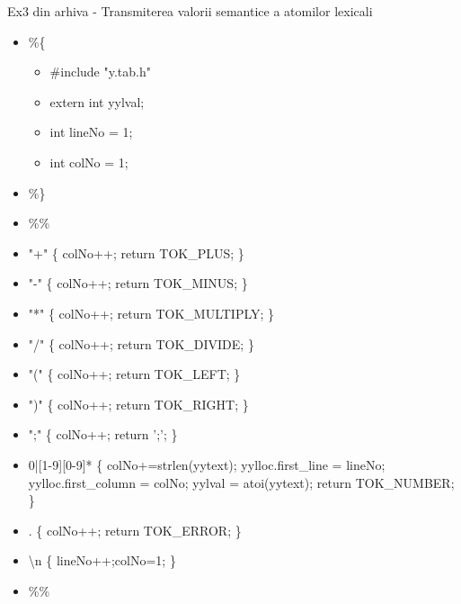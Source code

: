\documentclass[pdf]{beamer}
\begin{document}
\begin{frame}{Ex3 din arhiva - Transmiterea valorii semantice a atomilor lexicali}
\begin{itemize}
	\item[]
	\footnotesize\%\{
	
	\begin{itemize}
		\item[]
		\#include "y.tab.h"

		\item[]
		extern int yylval;

		\item[]
		int lineNo = 1;

		\item[]
		int colNo = 1;
	\end{itemize}
	
	\item[]
	\footnotesize\%\}

	\item[]
	\footnotesize\%\%

	\item[]
	"+" \hspace{1.55cm} \{ colNo++; return TOK\_PLUS; \}

	\item[]
	"-" \hspace{1.7cm} \{ colNo++; return TOK\_MINUS; \}

	\item[]
	"*" \hspace{1.65cm} \{ colNo++; return TOK\_MULTIPLY; \}

	\item[]
	"/" \hspace{1.65cm} \{ colNo++; return TOK\_DIVIDE; \}

	\item[]
	"(" \hspace{1.7cm} \{ colNo++; return TOK\_LEFT; \}

	\item[]
	")" \hspace{1.7cm} \{ colNo++; return TOK\_RIGHT; \}

	\item[]
	";" \hspace{1.75cm} \{ colNo++; return ';'; \}

	\item[]
	0|[1-9][0-9]* \hspace{0.5cm} \{ colNo+=strlen(yytext); yylloc.first\_line = lineNo; yylloc.first\_column = colNo; {\color{red}yylval = atoi(yytext)}; return TOK\_NUMBER;  \}

	\item[]
	. \hspace{2cm} \{ colNo++; return TOK\_ERROR; \}

	\item[]
	\textbackslash n \hspace{1.95cm}\{ lineNo++;colNo=1;  \}

	\item[]
	\footnotesize\%\%

\end{itemize}
\end{frame}
\end{document}
